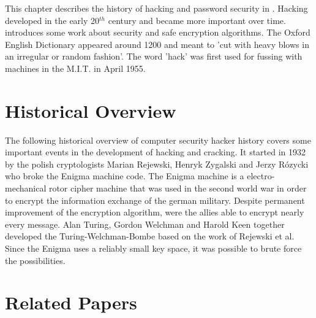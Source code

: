 This chapter describes the history of hacking and password security in . Hacking developed in the early 20$^{th}$ century and became more important over time.  introduces some work about security and safe encryption algorithms. 
The Oxford English Dictionary appeared around 1200 and meant to 'cut with heavy blows in an irregular or random fashion'. The word 'hack' was first used for fussing with machines in the M.I.T. in April 1955. 



\section{Historical Overview}
\label{sec:historicOverview}

The following historical overview of computer security hacker history covers some important events in the development of hacking and cracking. It started in 1932 by the polish cryptologists Marian Rejewski, Henryk Zygalski and Jerzy Rózycki who broke the Enigma machine code. The Enigma machine is a electro-mechanical rotor cipher machine that was used in the second world war in order to encrypt the information exchange of the german military. Despite permanent improvement of the encryption algorithm, were the allies able to encrypt nearly every message. 
Alan Turing, Gordon Welchman and Harold Keen together developed the Turing-Welchman-Bombe based on the work of Rejewski et al. Since the Enigma uses a reliably small key space, it was possible to brute force the possibilities. 



\section{Related Papers}
\label{sec:related}


